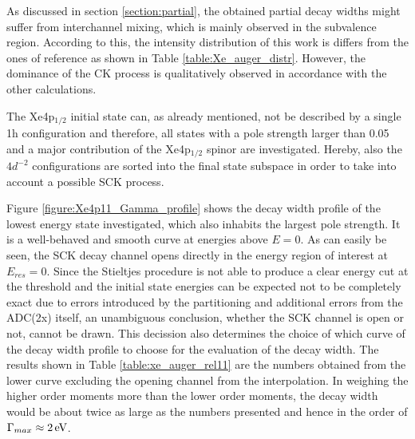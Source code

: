 As discussed in section \ref{section:partial}, the obtained partial decay
widths might suffer from interchannel mixing, which is mainly observed in
the subvalence region. According to this, the intensity distribution
of this work is differs from the ones of reference \cite{Heinaesmaeki04} as
shown in Table \ref{table:Xe_auger_distr}. However, the dominance of the
\ac{CK} process is qualitatively observed in accordance with the other
calculations.


The Xe4p$_{1/2}$ initial state can, as already mentioned, not be described
by a single 1h configuration and therefore, all states with a pole strength
larger than 0.05 and a major contribution of the Xe4p$_{1/2}$ spinor are
investigated. Hereby, also the $4d^{-2}$ configurations are sorted into the
final state subspace in order to take into account a possible \ac{SCK} process.

Figure \ref{figure:Xe4p11_Gamma_profile} shows the decay width profile
of the lowest energy state investigated, which also inhabits the largest
pole strength. It is a well-behaved and smooth curve at energies above $E=0$.
As can easily be seen, the \ac{SCK} decay channel opens directly
in the energy region of interest at $E_{res}=0$. Since the Stieltjes procedure
is not able to produce a clear energy cut at the threshold and the initial state
energies can be expected not to be completely exact due to errors introduced
by the partitioning and additional errors from the ADC(2x) itself, an
unambiguous conclusion, whether the \ac{SCK} channel is open or not, cannot be drawn.
This decission also determines the choice of which curve of the decay width
profile to choose for the evaluation of the decay width. The results shown
in Table \ref{table:xe_auger_rel11} are the numbers obtained from the
lower curve excluding
the opening channel from the interpolation. In weighing the higher order moments
more than the lower order moments, the decay width would be about twice
as large as the numbers
presented and hence in the order of $\Gamma_{max} \approx \unit[2]{eV}$.

